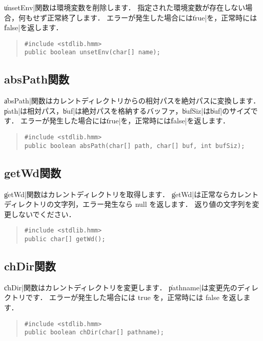 \|unsetEnv|関数は環境変数を削除します．
指定された環境変数が存在しない場合，何もせず正常終了します．
エラーが発生した場合には\|true|を，正常時には\|false|を返します．

\begin{quote}
\begin{verbatim}
#include <stdlib.hmm>
public boolean unsetEnv(char[] name);
\end{verbatim}
\end{quote}

\subsection{absPath関数}

\|absPath|関数はカレントディレクトリからの相対パスを絶対パスに変換します．
\|path|は相対パス，\|buf|は絶対パスを格納するバッファ，\|bufSiz|は\|buf|のサイズです．
エラーが発生した場合には\|true|を，正常時には\|false|を返します．

\begin{quote}
\begin{verbatim}
#include <stdlib.hmm>
public boolean absPath(char[] path, char[] buf, int bufSiz);
\end{verbatim}
\end{quote}

\subsection{getWd関数}

\|getWd|関数はカレントディレクトリを取得します．
\|getWd|は正常ならカレントディレクトリの文字列，エラー発生なら null を返します．
返り値の文字列を変更しないでください．

\begin{quote}
\begin{verbatim}
#include <stdlib.hmm>
public char[] getWd();
\end{verbatim}
\end{quote}

\subsection{chDir関数}

\|chDir|関数はカレントディレクトリを変更します．
\|pathname|は変更先のディレクトリです．
エラーが発生した場合には true を，正常時には false を返します．

\begin{quote}
\begin{verbatim}
#include <stdlib.hmm>
public boolean chDir(char[] pathname);
\end{verbatim}
\end{quote}

